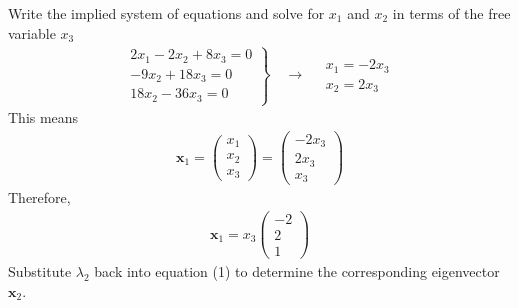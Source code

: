 \documentclass[12pt]{article}
\begin{document}
Write the implied system of equations and solve for \(x_{1}\) and \(x_{2}\) in terms
of the free variable \(x_{3}\) 
\begin{align*}
\left.\begin{array}{r}
2 x_{1}-2 x_{2}+8 x_{3}=0 \\
-9 x_{2}+18 x_{3}=0 \\
18 x_{2}-36 x_{3}=0
\end{array}\right\} \quad \rightarrow \quad \begin{array}{l}
x_{1}=-2 x_{3} \\
x_{2}=2 x_{3}
\end{array}
\end{align*}
This means
\begin{align*}
\mathbf{x}_{1}=\left(\begin{array}{l}
x_{1} \\
x_{2} \\
x_{3}
\end{array}\right)=\left(\begin{array}{c}
-2 x_{3} \\
2 x_{3} \\
x_{3}
\end{array}\right)
\end{align*}
Therefore,
\begin{align*}
\mathbf{x}_{1}=x_{3}\left(\begin{array}{c}
-2 \\
2 \\
1
\end{array}\right)
\end{align*}
Substitute \(\lambda_{2}\) back into equation (1) to determine the corresponding eigenvector \(\mathbf{x}_{2}\).
\end{document}
